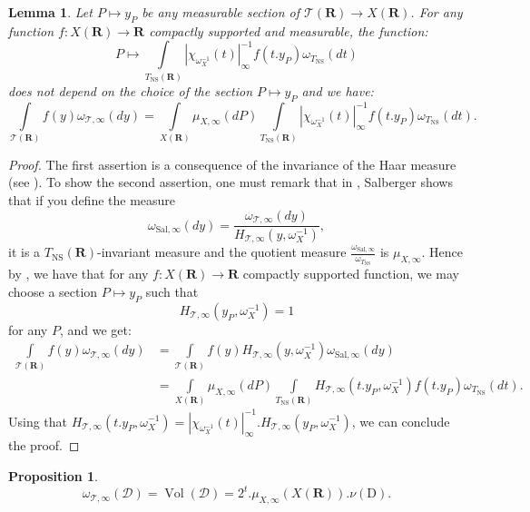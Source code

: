 \documentclass{proc-l}
\newcommand{\R}{\mathbf{R}}
\DeclareMathOperator{\Vol}{Vol}
\DeclareMathOperator{\NS}{NS}
\newcommand{\stackT}{\mathcal{T}}
\newcommand{\w}{\omega}
\newtheorem{lemma}[theorem]{Lemma}
\newtheorem{prop}[theorem]{Proposition}
\theoremstyle{definition}
\theoremstyle{remark}
\numberwithin{equation}{section}
\begin{document}
\begin{lemma}
    Let $P \mapsto y_P$ be any measurable section of $\stackT(\R) \rightarrow X(\R)$. For any function $f : X(\R) \rightarrow \R$ compactly supported and measurable, the function:
    $$ P \longmapsto \int\limits_{T_{\NS}(\R)} | \chi_{\w_{X}^{-1}}(t) |_{\infty}^{-1} f(t.y_P) \w_{T_{\NS}}(dt)$$ does not depend on the choice of the section $P \mapsto y_P$ and we have:
    $$ \int\limits_{\stackT(\R)} f(y) \w_{\stackT,\infty}(dy) = \int\limits_{X(\R)} \mu_{X,\infty}(dP) \int\limits_{T_{\NS}(\R)} | \chi_{\w_{X}^{-1}}(t) |_{\infty}^{-1} f(t.y_P) \w_{T_{\NS}}(dt) .$$
\end{lemma}

\begin{proof}
    The first assertion is a consequence of the invariance of the Haar measure (see \cite[chapitre VII, §2, n°2, proposition 1]{bourbaki2007integration}). To show the second assertion, one must remark that in \cite[section 5]{salberger_torsor}, Salberger shows that if you define the measure $$\w_{\text{Sal},\infty}(dy) = \frac{\w_{\stackT,\infty}(dy)}{H_{\stackT,\infty}(y,\w_X^{-1})} ,$$ it is a $T_{\NS}(\R)$-invariant measure and the quotient measure $\frac{\w_{\text{Sal},\infty}}{\w_{T_{\NS}}} $ is $\mu_{X,\infty}$. Hence by \cite[chapitre VII, §2, n°2, proposition 4]{bourbaki2007integration}, we have that for any $f : X(\R) \rightarrow \R$ compactly supported function, we may choose a section $P \mapsto y_P$ such that $$H_{\stackT,\infty}(y_P,\w_{X}^{-1}) = 1$$for any $P$, and we get:
    \begin{align*}
      \int\limits_{\stackT(\R)} f(y) \w_{\stackT,\infty}(dy)  &= \int\limits_{\stackT(\R)} f(y) H_{\stackT,\infty}(y,\w_{X}^{-1}) \w_{\text{Sal},\infty}(dy) \\
      &= \int\limits_{X(\R)} \mu_{X,\infty}(dP) \int\limits_{T_{\NS}(\R)} H_{\stackT,\infty}(t.y_P,\w_{X}^{-1}) f(t.y_P) \w_{T_{\NS}}(dt) .
    \end{align*}Using that $ H_{\stackT,\infty}(t.y_P,\w_{X}^{-1}) = | \chi_{\w_{X}^{-1}}(t) |^{-1}_{\infty} . H_{\stackT,\infty}(y_P,\w_{X}^{-1}) $, we can conclude the proof.
\end{proof}


\begin{prop}\label{analysis_measure_univ_torsor_at_infty}
   $$ \w_{\stackT,\infty}(\mathcal{D}) = \Vol(\mathcal{D}) = 2^t .\mu_{X,\infty}(X(\R)) . \nu(\mathrm{D}) . $$
\end{prop}
\end{document}
